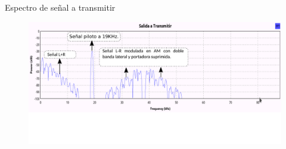 \begin{frame}{Espectro de señal a transmitir}

\begin{figure}[H]
\centering
\vspace{-3mm}
\includegraphics[width=\textwidth]{parte3/lab13/pdf/lab13_4.pdf}
\end{figure}
\end{frame}
